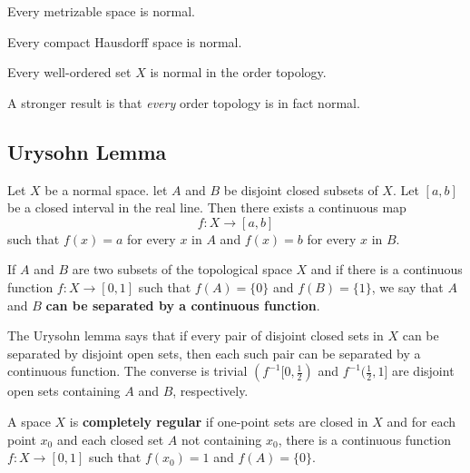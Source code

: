 \begin{theorem}
Every metrizable space is normal.
\end{theorem}

\begin{theorem}
Every compact Hausdorff space is normal.
\end{theorem}

\begin{theorem}
Every well-ordered set $X$ is normal in the order topology.
\end{theorem}

\begin{remark}
A stronger result is that \textit{every} order topology is in fact normal.
\end{remark}


\subsection{Urysohn Lemma}

\begin{theorem}
Let $X$ be a normal space. let $A$ and $B$ be disjoint closed subsets of $X$. Let $[a, b]$ be a closed interval in the real line.
Then there exists a continuous map
\[
    f\colon X \rightarrow [a, b]
\]
such that $f(x) = a$ for every $x$ in $A$ and $f(x) = b$ for every $x$ in $B$.
\end{theorem}

\begin{definition}
If $A$ and $B$ are two subsets of the topological space $X$ and if there is a continuous function $f\colon X \rightarrow [0, 1]$ such that
$f(A) = \{ 0 \}$ and $f(B) = \{ 1 \}$, we say that $A$ and $B$ \textbf{can be separated by a continuous function}. 
\end{definition}

\begin{remark}
The Urysohn lemma says that if every pair of disjoint closed sets in $X$ can be separated by disjoint open sets,
then each such pair can be separated by a continuous function. The converse is trivial $(f^{-1}[0, \frac{1}{2})$ and $f^{-1}(\frac{1}{2}, 1]$ are disjoint
open sets containing $A$ and $B$, respectively.
\end{remark}

\begin{definition}
A space $X$ is \textbf{completely regular} if one-point sets are closed in $X$ and for each point $x_0$ and each closed set $A$ not containing $x_0$,
there is a continuous function $f\colon X \rightarrow [0, 1]$ such that $f(x_0) = 1$ and $f(A) = \{ 0 \}.$
\end{definition}

